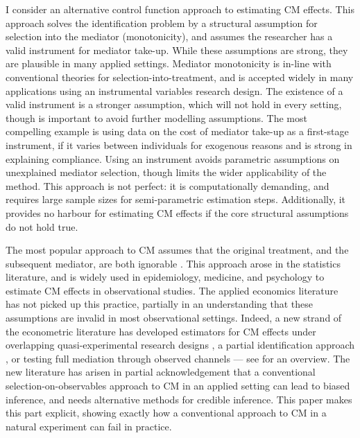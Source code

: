 I consider an alternative control function approach to estimating CM effects.
This approach solves the identification problem by a structural assumption for selection into the mediator (monotonicity), and assumes the researcher has a valid instrument for mediator take-up.
While these assumptions are strong, they are plausible in many applied settings.
Mediator monotonicity is in-line with conventional theories for selection-into-treatment, and is accepted widely in many applications using an instrumental variables research design.
The existence of a valid instrument is a stronger assumption, which will not hold in every setting, though is important to avoid further modelling assumptions. %
The most compelling example is using data on the cost of mediator take-up as a first-stage instrument, if it varies between individuals for exogenous reasons and is strong in explaining compliance.
Using an instrument avoids parametric assumptions on unexplained mediator selection, though limits the wider applicability of the method.
This approach is not perfect: it is computationally demanding, and requires large sample sizes for semi-parametric estimation steps.
Additionally, it provides no harbour for estimating CM effects if the core structural assumptions do not hold true.

The most popular approach to CM assumes that the original treatment, and the subsequent mediator, are both ignorable \citep{imai2010identification}.
This approach arose in the statistics literature, and is widely used in epidemiology, medicine, and psychology to estimate CM effects in observational studies.
The applied economics literature has not picked up this practice, partially in an understanding that these assumptions are invalid in most observational settings.
Indeed, a new strand of the econometric literature has developed estimators for CM effects under overlapping quasi-experimental research designs \citep{deuchert2019direct,frolich2017direct}, a partial identification approach \citep{flores2009identification}, or testing full mediation through observed channels \citep{kwon2024testing} --- see \cite{huber2019review} for an overview.
The new literature has arisen in partial acknowledgement that a conventional selection-on-observables approach to CM in an applied setting can lead to biased inference, and needs alternative methods for credible inference.
This paper makes this part explicit, showing exactly how a conventional approach to CM in a natural experiment can fail in practice.

